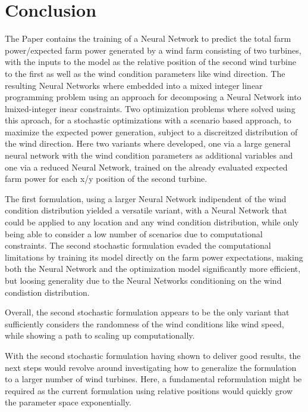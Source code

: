 \documentclass[preprint,12pt]{elsarticle}
\begin{document}
\section{Conclusion}\label{chapter:conclusion}

The Paper contains the training of a Neural Network to predict the total farm power/expected farm power generated by a wind farm consisting of two turbines, with the inputs to the model as the relative position of the second wind turbine to the first as well as the wind condition parameters like wind direction. The resulting Neural Networks where embedded into a mixed integer linear programming problem using an approach for decomposing a Neural Network into lmixed-integer inear constraints. Two optimization problems where solved using this aproach, for a stochastic optimizations with a scenario based approach, to maximize the expected power generation, subject to a discreitzed distribution of the wind direction. Here two variants where developed, one via a large general neural network with the wind condition parameters as additional variables and one via a reduced Neural Network, trained on the already evaluated expected farm power for each x/y position of the second turbine. 

The first formulation, using a larger Neural Network indipendent of the wind condition distribution yielded a versatile variant, with a Neural Network that could be applied to any location and any wind condition distribution, while only being able to consider a low number of scenarios due to computational constraints. The second stochastic formulation evaded the computational limitations by training its model directly on the farm power expectations, making both the Neural Network and the optimization model significantly more efficient, but loosing generality due to the Neural Networks conditioning on the wind condistion distribution.

Overall, the second stochastic formulation appears to be the only variant that sufficiently considers the randomness of the wind conditions like wind speed, while showing a path to scaling up computationally.

With the second stochastic formulation having shown to deliver good results, the next steps would revolve around investigating how to generalize the formulation to a larger number of wind turbines. Here, a fundamental reformulation might be required as the current formulation using relative positions would quickly grow the parameter space exponentially. 
\end{document}
